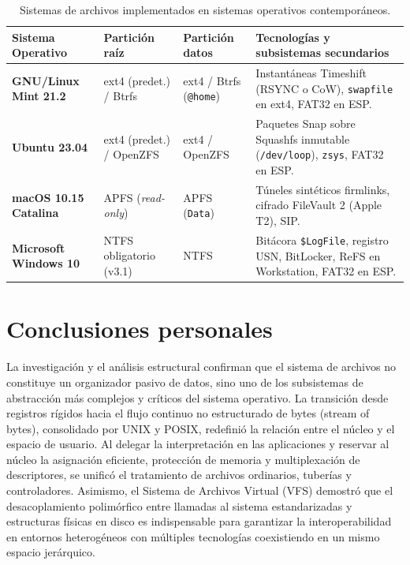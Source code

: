 \documentclass[12pt]{article}
\begin{document}
\begin{table}[H]
\centering
\scriptsize
\captionsetup{skip=4pt}
\renewcommand{\arraystretch}{0.85}
\renewcommand{\tabularxcolumn}[1]{m{#1}}
\setlength{\tabcolsep}{3pt}
\setlength{\emergencystretch}{1.5em}
\caption{Sistemas de archivos implementados en sistemas operativos contemporáneos.}
\label{tab:sistemasArchivosSistemasOperativos}
\begin{tabularx}{\textwidth}{>{\centering\arraybackslash}m{2.3cm} >{\centering\arraybackslash}m{2.4cm} >{\centering\arraybackslash}m{2.4cm} X}
\toprule
\textbf{Sistema Operativo} & \textbf{Partición raíz} & \textbf{Partición datos} & \textbf{Tecnologías y subsistemas secundarios} \\
\midrule
\textbf{GNU/Linux Mint 21.2} & ext4 (predet.) / Btrfs & ext4 / Btrfs (\texttt{@home}) & Instantáneas Timeshift (RSYNC o CoW), \texttt{swapfile} en ext4, FAT32 en ESP. \\
\textbf{Ubuntu 23.04} & ext4 (predet.) / OpenZFS & ext4 / OpenZFS & Paquetes Snap sobre Squashfs inmutable (\texttt{/dev/loop}), \texttt{zsys}, FAT32 en ESP. \\
\textbf{macOS 10.15 Catalina} & APFS (\textit{read-only}) & APFS (\texttt{Data}) & Túneles sintéticos firmlinks, cifrado FileVault 2 (Apple T2), SIP. \\
\textbf{Microsoft Windows 10} & NTFS obligatorio (v3.1) & NTFS & Bitácora \texttt{\$LogFile}, registro USN, BitLocker, ReFS en Workstation, FAT32 en ESP. \\
\bottomrule
\end{tabularx}
\end{table}

\section{Conclusiones personales}
\label{sec:conclusionesPersonales}

La investigación y el análisis estructural confirman que el sistema de archivos no constituye un organizador pasivo de datos, sino uno de los subsistemas de abstracción más complejos y críticos del sistema operativo. La transición desde registros rígidos hacia el flujo continuo no estructurado de bytes (stream of bytes), consolidado por UNIX y POSIX, redefinió la relación entre el núcleo y el espacio de usuario. Al delegar la interpretación en las aplicaciones y reservar al núcleo la asignación eficiente, protección de memoria y multiplexación de descriptores, se unificó el tratamiento de archivos ordinarios, tuberías y controladores. Asimismo, el Sistema de Archivos Virtual (VFS) demostró que el desacoplamiento polimórfico entre llamadas al sistema estandarizadas y estructuras físicas en disco es indispensable para garantizar la interoperabilidad en entornos heterogéneos con múltiples tecnologías coexistiendo en un mismo espacio jerárquico.
\end{document}
